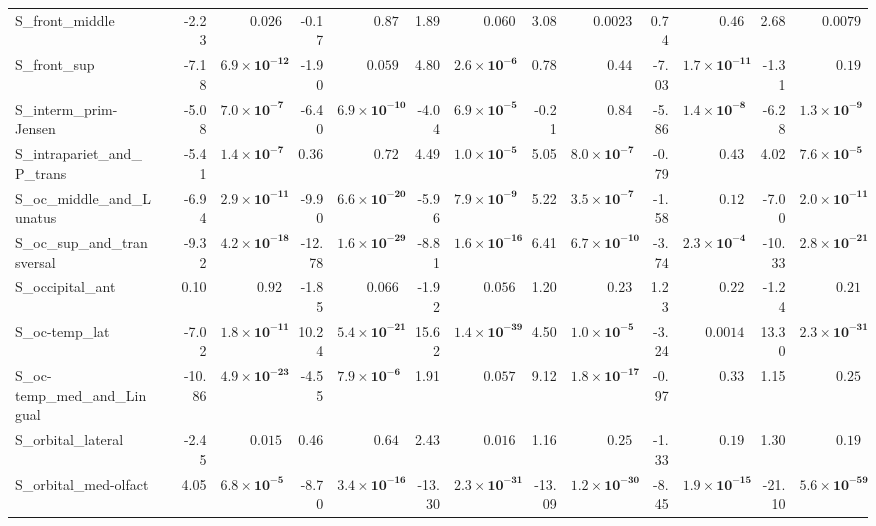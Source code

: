 {\begin{longtable}{llrrrrrrrrrrrr}
S\_front\_middle &  & -2.23 & $0.026$ & -0.17 & $0.87$ & 1.89 & $0.060$ & 3.08 & $0.0023$ & 0.74 & $0.46$ & 2.68 & $0.0079$ \\
S\_front\_sup &  & -7.18 & $\mathbf{6.9{\times}10^{-12}}$ & -1.90 & $0.059$ & 4.80 & $\mathbf{2.6{\times}10^{-6}}$ & 0.78 & $0.44$ & -7.03 & $\mathbf{1.7{\times}10^{-11}}$ & -1.31 & $0.19$ \\
S\_interm\_prim-Jensen &  & -5.08 & $\mathbf{7.0{\times}10^{-7}}$ & -6.40 & $\mathbf{6.9{\times}10^{-10}}$ & -4.04 & $\mathbf{6.9{\times}10^{-5}}$ & -0.21 & $0.84$ & -5.86 & $\mathbf{1.4{\times}10^{-8}}$ & -6.28 & $\mathbf{1.3{\times}10^{-9}}$ \\
S\_intrapariet\_and\_P\_trans &  & -5.41 & $\mathbf{1.4{\times}10^{-7}}$ & 0.36 & $0.72$ & 4.49 & $\mathbf{1.0{\times}10^{-5}}$ & 5.05 & $\mathbf{8.0{\times}10^{-7}}$ & -0.79 & $0.43$ & 4.02 & $\mathbf{7.6{\times}10^{-5}}$ \\
S\_oc\_middle\_and\_Lunatus &  & -6.94 & $\mathbf{2.9{\times}10^{-11}}$ & -9.90 & $\mathbf{6.6{\times}10^{-20}}$ & -5.96 & $\mathbf{7.9{\times}10^{-9}}$ & 5.22 & $\mathbf{3.5{\times}10^{-7}}$ & -1.58 & $0.12$ & -7.00 & $\mathbf{2.0{\times}10^{-11}}$ \\
S\_oc\_sup\_and\_transversal &  & -9.32 & $\mathbf{4.2{\times}10^{-18}}$ & -12.78 & $\mathbf{1.6{\times}10^{-29}}$ & -8.81 & $\mathbf{1.6{\times}10^{-16}}$ & 6.41 & $\mathbf{6.7{\times}10^{-10}}$ & -3.74 & $\mathbf{2.3{\times}10^{-4}}$ & -10.33 & $\mathbf{2.8{\times}10^{-21}}$ \\
S\_occipital\_ant &  & 0.10 & $0.92$ & -1.85 & $0.066$ & -1.92 & $0.056$ & 1.20 & $0.23$ & 1.23 & $0.22$ & -1.24 & $0.21$ \\
S\_oc-temp\_lat &  & -7.02 & $\mathbf{1.8{\times}10^{-11}}$ & 10.24 & $\mathbf{5.4{\times}10^{-21}}$ & 15.62 & $\mathbf{1.4{\times}10^{-39}}$ & 4.50 & $\mathbf{1.0{\times}10^{-5}}$ & -3.24 & $0.0014$ & 13.30 & $\mathbf{2.3{\times}10^{-31}}$ \\
S\_oc-temp\_med\_and\_Lingual &  & -10.86 & $\mathbf{4.9{\times}10^{-23}}$ & -4.55 & $\mathbf{7.9{\times}10^{-6}}$ & 1.91 & $0.057$ & 9.12 & $\mathbf{1.8{\times}10^{-17}}$ & -0.97 & $0.33$ & 1.15 & $0.25$ \\
S\_orbital\_lateral &  & -2.45 & $0.015$ & 0.46 & $0.64$ & 2.43 & $0.016$ & 1.16 & $0.25$ & -1.33 & $0.19$ & 1.30 & $0.19$ \\
S\_orbital\_med-olfact &  & 4.05 & $\mathbf{6.8{\times}10^{-5}}$ & -8.70 & $\mathbf{3.4{\times}10^{-16}}$ & -13.30 & $\mathbf{2.3{\times}10^{-31}}$ & -13.09 & $\mathbf{1.2{\times}10^{-30}}$ & -8.45 & $\mathbf{1.9{\times}10^{-15}}$ & -21.10 & $\mathbf{5.6{\times}10^{-59}}$ \\

\end{longtable}}
